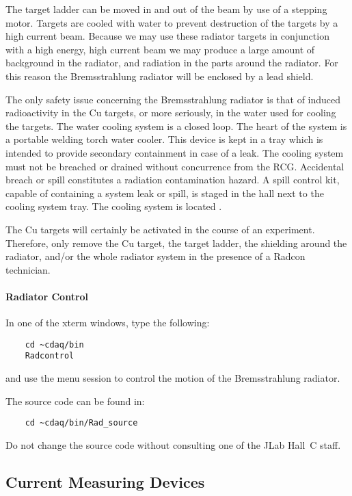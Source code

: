 The target ladder can be moved in and out of the beam by use of
a stepping motor. Targets are cooled with water to prevent destruction
of the targets by a high current beam.
Because we may use these radiator targets in conjunction with a high
energy, high current beam we may produce a large amount of background
in the radiator, and radiation in the parts around the radiator.
For this reason the Bremsstrahlung radiator will be enclosed by a lead
shield.

The only safety issue concerning the Bremsstrahlung radiator is that of
induced radioactivity in
the Cu targets, or more seriously, in the water used for cooling the targets.
 The water cooling system is a closed loop. The heart of the system is
a portable welding torch water cooler. This device is kept in a tray
which is intended to provide secondary containment in case of a leak.
 The cooling system must not be breached or drained without concurrence from the RCG.  
Accidental breach or spill constitutes a radiation contamination hazard.  A spill control kit, 
capable of containing a system leak or spill, is staged in the hall next to the cooling system 
tray.  The cooling system is located    .

The Cu targets will certainly be activated in the course of an experiment.
Therefore, only remove
the Cu target, the target ladder, the shielding around the radiator,
and/or the whole radiator system in the presence of a Radcon technician.

\paragraph{Radiator Control}

In one of the xterm windows, type the following:

\begin{verbatim}
	cd ~cdaq/bin
	Radcontrol
\end{verbatim}

and use the menu session to control the motion of the
Bremsstrahlung radiator.

The source code can be found in:

\begin{verbatim}
	cd ~cdaq/bin/Rad_source
\end{verbatim}

Do not change the source code without consulting
one of the JLab Hall~C staff.

\subsection{Current Measuring Devices}

